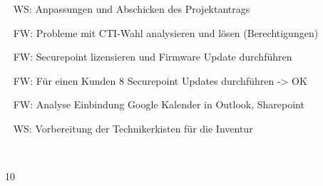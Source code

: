 {{	\textbullet~ WS: Anpassungen und Abschicken des Projektantrags\par
	\textbullet~ FW: Probleme mit CTI-Wahl analysieren und lösen (Berechtigungen)\par
	\textbullet~ FW: Securepoint lizensieren und Firmware Update durchführen\par
	\textbullet~ FW: Für einen Kunden 8 Securepoint Updates durchführen -> OK\par
	\textbullet~ FW: Analyse Einbindung Google Kalender in Outlook, Sharepoint\par
	\textbullet~ WS: Vorbereitung der Technikerkisten für die Inventur\par
	\textbullet~ 
	}{}{10}
}{}
\Unterschrift
\newpage
